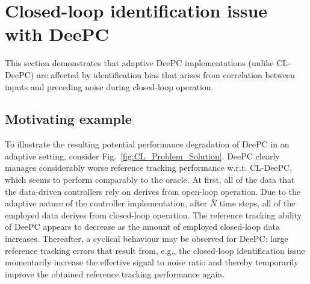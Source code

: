 \section{Closed-loop identification issue with \ac{DeePC}}\label{sec:CL_ID_issue}
%
\noindent This section demonstrates that adaptive \ac{DeePC} implementations (unlike \ac{CL-DeePC}) are affected by identification bias that arises from correlation between inputs and preceding noise during closed-loop operation.

\subsection{Motivating example}
\noindent To illustrate the resulting potential performance degradation of \ac{DeePC} in an adaptive setting, consider Fig.~\ref{fig:CL_Problem_Solution}. \ac{DeePC} clearly manages considerably worse reference tracking performance w.r.t. \ac{CL-DeePC}, which seems to perform comparably to the oracle. At first, all of the data that the data-driven controllers rely on derives from open-loop operation. Due to the adaptive nature of the controller implementation, after $\bar{N}$ time steps, all of the employed data derives from closed-loop operation. The reference tracking ability of \ac{DeePC} appears to decrease as the amount of employed closed-loop data increases. Thereafter, a cyclical behaviour may be observed for \ac{DeePC}: large reference tracking errors that result from, e.g., the closed-loop identification issue momentarily increase the effective signal to noise ratio and thereby temporarily improve the obtained reference tracking performance again.
